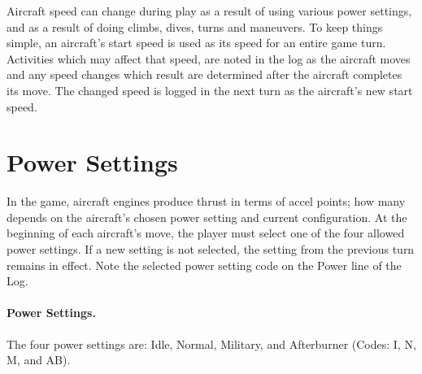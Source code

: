 
Aircraft speed can change during play as a result of using various power settings, and as a result of doing climbs, dives, turns and maneuvers. To keep things simple, an aircraft's start speed is used as its speed for an entire game turn. Activities which may affect that speed, are noted in the log as the aircraft moves and any speed changes which result are determined after the aircraft completes its move. The changed speed is logged in the next turn as the aircraft's new start speed.

\section{Power Settings}

In the game, aircraft engines produce thrust in terms of accel points; how many depends on the aircraft's chosen power setting and current configuration. At the beginning of each aircraft's move, the player must select one of the four allowed power settings. If a new setting is not selected, the setting from the previous turn remains in effect. Note the selected power setting code on the Power line of the Log.

\paragraph{Power Settings.} The four power settings are: Idle, Normal, Military, and Afterburner (Codes: I, N, M, and AB).

